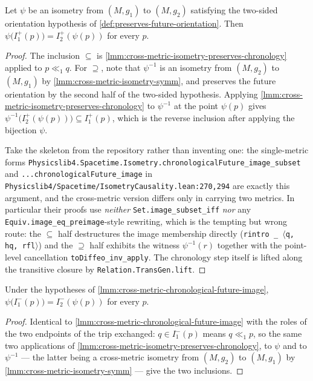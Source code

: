 \begin{lemma}
    \label{lmm:cross-metric-chronological-future-image}
    Let $\psi$ be an isometry from $(M,g_1)$ to $(M,g_2)$ satisfying the two-sided orientation hypothesis of \ref{def:preserves-future-orientation}. Then $\psi\big(I^+_1(p)\big) = I^+_2(\psi(p))$ for every $p$.
\end{lemma}
\begin{proof}
    The inclusion $\subseteq$ is \ref{lmm:cross-metric-isometry-preserves-chronology} applied to $p \ll_1 q$. For $\supseteq$, note that $\psi^{-1}$ is an isometry from $(M,g_2)$ to $(M,g_1)$ by \ref{lmm:cross-metric-isometry-symm}, and preserves the future orientation by the second half of the two-sided hypothesis. Applying \ref{lmm:cross-metric-isometry-preserves-chronology} to $\psi^{-1}$ at the point $\psi(p)$ gives $\psi^{-1}\big(I^+_2(\psi(p))\big) \subseteq I^+_1(p)$, which is the reverse inclusion after applying the bijection $\psi$.

    Take the skeleton from the repository rather than inventing one: the single-metric forms \texttt{Physicslib4.Spacetime.Isometry.chronologicalFuture\_image\_subset} and \texttt{...chronologicalFuture\_image} in \texttt{Physicslib4/Spacetime/IsometryCausality.lean:270,294} are exactly this argument, and the cross-metric version differs only in carrying two metrics. In particular their proofs use \emph{neither} \texttt{Set.image\_subset\_iff} \emph{nor} any \texttt{Equiv.image\_eq\_preimage}-style rewriting, which is the tempting but wrong route: the $\subseteq$ half destructures the image membership directly (\texttt{rintro \_ $\langle$q, hq, rfl$\rangle$}) and the $\supseteq$ half exhibits the witness $\psi^{-1}(r)$ together with the point-level cancellation \texttt{toDiffeo\_inv\_apply}. The chronology step itself is lifted along the transitive closure by \texttt{Relation.TransGen.lift}.
\end{proof}

\begin{lemma}
    \label{lmm:cross-metric-chronological-past-image}
    Under the hypotheses of \ref{lmm:cross-metric-chronological-future-image}, $\psi\big(I^-_1(p)\big) = I^-_2(\psi(p))$ for every $p$.
\end{lemma}
\begin{proof}
    Identical to \ref{lmm:cross-metric-chronological-future-image} with the roles of the two endpoints of the trip exchanged: $q \in I^-_1(p)$ means $q \ll_1 p$, so the same two applications of \ref{lmm:cross-metric-isometry-preserves-chronology}, to $\psi$ and to $\psi^{-1}$ --- the latter being a cross-metric isometry from $(M,g_2)$ to $(M,g_1)$ by \ref{lmm:cross-metric-isometry-symm} --- give the two inclusions.
\end{proof}

